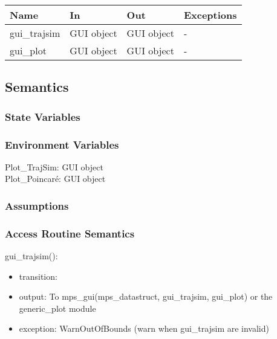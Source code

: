 \documentclass[12pt, titlepage]{article}
\begin{document}
\begin{center}
\begin{tabular}{p{2cm} p{4cm} p{4cm} p{2cm}}
\hline
\textbf{Name} & \textbf{In} & \textbf{Out} & \textbf{Exceptions} \\
\hline
gui\_trajsim & GUI object & GUI object & - \\
gui\_plot & GUI object & GUI object & - \\
\hline
\end{tabular}
\end{center}

\subsection{Semantics}

\subsubsection{State Variables}

\subsubsection{Environment Variables}

\noindent Plot{\_}TrajSim: GUI object\\
Plot{\_}Poincar\'{e}: GUI object\\

\subsubsection{Assumptions}


\subsubsection{Access Routine Semantics}

\noindent gui\_trajsim():
\begin{itemize}
\item transition:  
\item output: To mps\_gui(mps\_datastruct, gui\_trajsim, gui\_plot) or the generic\_plot module  
\item exception: WarnOutOfBounds (warn when gui\_trajsim are invalid)  
\end{itemize}
\end{document}
